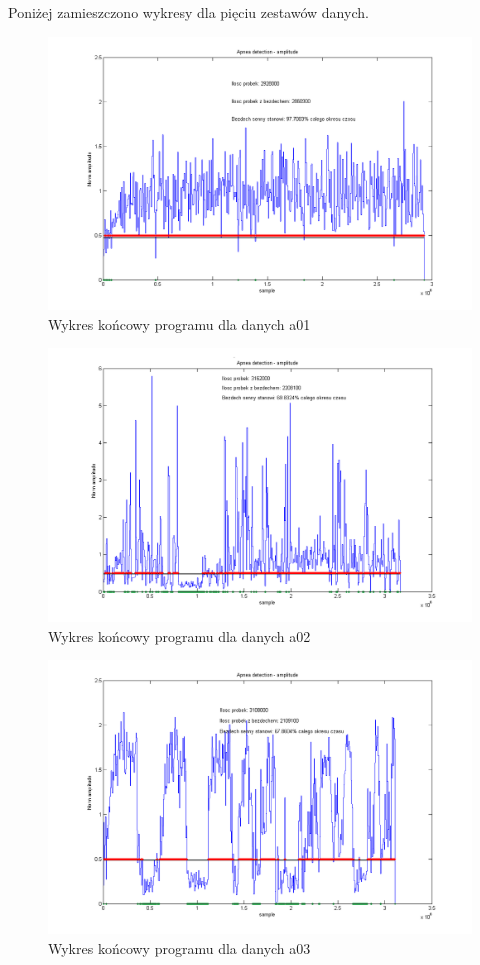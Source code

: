 Poniżej zamieszczono wykresy dla pięciu zestawów danych.
\newpage
\begin{figure}[H]
\centering
\includegraphics[scale=0.7, angle=90]{SLEEP_APNEA/img/apnea1.png}
\caption{Wykres końcowy programu dla danych a01}
\label{fig:apnea_1}
\end{figure} 
\newpage
\begin{figure}[H]
\centering
\includegraphics[scale=0.7, angle=90]{SLEEP_APNEA/img/apnea2.png}
\caption{Wykres końcowy programu dla danych a02}
\label{fig:apnea_2}
\end{figure}
 \newpage
\begin{figure}[H]
\centering
\includegraphics[scale=0.7, angle=90]{SLEEP_APNEA/img/apnea3.png}
\caption{Wykres końcowy programu dla danych a03}
\label{fig:apnea_3}
\end{figure} 
